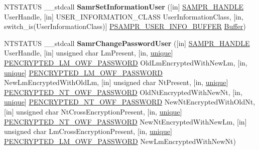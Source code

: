 \begin{DoxyCompactItemize}
\item 
\mbox{\label{interfacesamr_a81b77807daf0884568fffbcbb179229f}} 
N\+T\+S\+T\+A\+T\+US \+\_\+\+\_\+stdcall {\bfseries Samr\+Set\+Information\+User} (\mbox{[}in\mbox{]} \hyperlink{interfacevoid}{S\+A\+M\+P\+R\+\_\+\+H\+A\+N\+D\+LE} User\+Handle, \mbox{[}in\mbox{]} U\+S\+E\+R\+\_\+\+I\+N\+F\+O\+R\+M\+A\+T\+I\+O\+N\+\_\+\+C\+L\+A\+SS User\+Information\+Class, \mbox{[}in, switch\+\_\+is(User\+Information\+Class)\mbox{]} \hyperlink{union___s_a_m_p_r___u_s_e_r___i_n_f_o___b_u_f_f_e_r}{P\+S\+A\+M\+P\+R\+\_\+\+U\+S\+E\+R\+\_\+\+I\+N\+F\+O\+\_\+\+B\+U\+F\+F\+ER} \hyperlink{class_buffer}{Buffer})
\item 
\mbox{\label{interfacesamr_a392bd8c7c75902b95f8e5ad7e0fa0eca}} 
N\+T\+S\+T\+A\+T\+US \+\_\+\+\_\+stdcall {\bfseries Samr\+Change\+Password\+User} (\mbox{[}in\mbox{]} \hyperlink{interfacevoid}{S\+A\+M\+P\+R\+\_\+\+H\+A\+N\+D\+LE} User\+Handle, \mbox{[}in\mbox{]} unsigned char Lm\+Present, \mbox{[}in, \hyperlink{interfaceunique}{unique}\mbox{]} \hyperlink{struct___e_n_c_r_y_p_t_e_d___l_m___o_w_f___p_a_s_s_w_o_r_d}{P\+E\+N\+C\+R\+Y\+P\+T\+E\+D\+\_\+\+L\+M\+\_\+\+O\+W\+F\+\_\+\+P\+A\+S\+S\+W\+O\+RD} Old\+Lm\+Encrypted\+With\+New\+Lm, \mbox{[}in, \hyperlink{interfaceunique}{unique}\mbox{]} \hyperlink{struct___e_n_c_r_y_p_t_e_d___l_m___o_w_f___p_a_s_s_w_o_r_d}{P\+E\+N\+C\+R\+Y\+P\+T\+E\+D\+\_\+\+L\+M\+\_\+\+O\+W\+F\+\_\+\+P\+A\+S\+S\+W\+O\+RD} New\+Lm\+Encrypted\+With\+Old\+Lm, \mbox{[}in\mbox{]} unsigned char Nt\+Present, \mbox{[}in, \hyperlink{interfaceunique}{unique}\mbox{]} \hyperlink{struct___e_n_c_r_y_p_t_e_d___l_m___o_w_f___p_a_s_s_w_o_r_d}{P\+E\+N\+C\+R\+Y\+P\+T\+E\+D\+\_\+\+N\+T\+\_\+\+O\+W\+F\+\_\+\+P\+A\+S\+S\+W\+O\+RD} Old\+Nt\+Encrypted\+With\+New\+Nt, \mbox{[}in, \hyperlink{interfaceunique}{unique}\mbox{]} \hyperlink{struct___e_n_c_r_y_p_t_e_d___l_m___o_w_f___p_a_s_s_w_o_r_d}{P\+E\+N\+C\+R\+Y\+P\+T\+E\+D\+\_\+\+N\+T\+\_\+\+O\+W\+F\+\_\+\+P\+A\+S\+S\+W\+O\+RD} New\+Nt\+Encrypted\+With\+Old\+Nt, \mbox{[}in\mbox{]} unsigned char Nt\+Cross\+Encryption\+Present, \mbox{[}in, \hyperlink{interfaceunique}{unique}\mbox{]} \hyperlink{struct___e_n_c_r_y_p_t_e_d___l_m___o_w_f___p_a_s_s_w_o_r_d}{P\+E\+N\+C\+R\+Y\+P\+T\+E\+D\+\_\+\+N\+T\+\_\+\+O\+W\+F\+\_\+\+P\+A\+S\+S\+W\+O\+RD} New\+Nt\+Encrypted\+With\+New\+Lm, \mbox{[}in\mbox{]} unsigned char Lm\+Cross\+Encryption\+Present, \mbox{[}in, \hyperlink{interfaceunique}{unique}\mbox{]} \hyperlink{struct___e_n_c_r_y_p_t_e_d___l_m___o_w_f___p_a_s_s_w_o_r_d}{P\+E\+N\+C\+R\+Y\+P\+T\+E\+D\+\_\+\+L\+M\+\_\+\+O\+W\+F\+\_\+\+P\+A\+S\+S\+W\+O\+RD} New\+Lm\+Encrypted\+With\+New\+Nt)

\end{DoxyCompactItemize}
